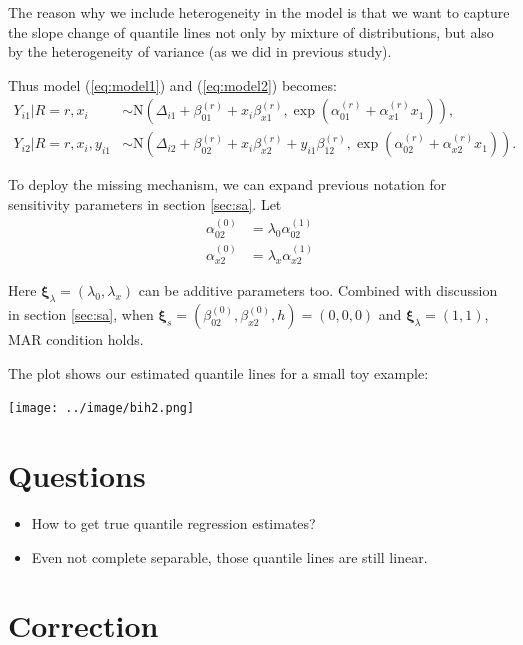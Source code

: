 \documentclass[12pt]{article}
\begin{document}
The reason why we include heterogeneity in the model is that we want
to capture the slope change of quantile lines not only by mixture of
distributions, but also by the heterogeneity of variance (as we did in
previous study).

Thus model (\ref{eq:model1}) and (\ref{eq:model2}) becomes:
\begin{align*}
  Y_{i1}|R = r, x_i &\sim \textrm{N}(\Delta_{i1} + \beta_{01}^{(r)} + x_i\beta_{x1}^{(r)}, \exp(\alpha_{01}^{(r)} + \alpha_{x1}^{(r)} x_1)),\\
  Y_{i2}|R = r, x_i, y_{i1} & \sim \textrm{N}(\Delta_{i2} + \beta_{02}^{(r)} +
  x_i\beta_{x2}^{(r)} + y_{i1}\beta_{12}^{(r)}, \exp(\alpha_{02}^{(r)}
  + \alpha_{x2}^{(r)} x_1 )).
\end{align*}

To deploy the missing mechanism, we can expand previous notation for
sensitivity parameters in section \ref{sec:sa}. Let
\begin{align*}
  \alpha_{02}^{(0)} & = \lambda_0 \alpha_{02}^{(1)} \\
  \alpha_{x2}^{(0)} & = \lambda_x \alpha_{x2}^{(1)}
\end{align*}

Here $\bm \xi_{\lambda} = (\lambda_0, \lambda_x) $ can be additive parameters too. Combined
with discussion in section \ref{sec:sa}, when $\bm \xi_s =
(\beta_{02}^{(0)} , \beta_{x2}^{(0)}, h) = (0, 0, 0) $
and $\bm \xi_{\lambda} = (1, 1)$, MAR condition holds.

The plot shows our estimated quantile lines for a small toy example:

\begin{center}
\texttt{[image: ../image/bih2.png]}
\end{center}

\section{Questions}
 
\begin{itemize}
\item How to get true quantile regression estimates?
\item Even not complete separable, those quantile lines are still linear. 
\end{itemize}

\section{Correction}
\end{document}
